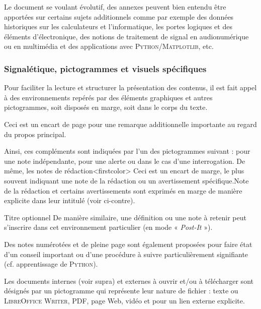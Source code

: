 Le document se voulant évolutif, des annexes peuvent bien entendu être apportées sur certains sujets additionnels comme par exemple des données historiques sur les calculateurs et l'informatique, les portes logiques et des éléments d'électronique, des notions de traitement de signal en audionumérique ou en multimédia et des applications avec \textsc{Python}/\textsc{Matplotlib}, etc.


\subsubsection*{Signalétique, pictogrammes et visuels spécifiques}

Pour faciliter la lecture et structurer la présentation des contenus, il est fait appel à des environnements repérés par des éléments graphiques et autres pictogrammes, soit disposés en marge, soit dans le corps du texte.

\pagebreak
\begin{remark}
Ceci est un encart de page pour une remarque additionnelle importante au regard du propos principal.
\end{remark}

Ainsi, ces compléments sont indiquées par l'un des pictogrammes suivant : \textcolor{firstcolor}{\faEye} pour une note indépendante, \textcolor{firstcolor}{\faExclamationTriangle} pour une alerte ou \textcolor{firstcolor}{\faQuestion} dans le cas d'une interrogation.
De même, les notes de rédaction\caution[t]<firstcolor>{%
Ceci est un encart de marge, le plus souvent indiquant une note de la rédaction ou un avertissement spécifique.}{Note de la rédaction}
 et certains avertissements sont exprimés en marge de manière explicite dans leur intitulé (voir ci-contre).

\begin{marker}{Titre optionnel}
De manière similaire, une définition ou une note à retenir peut s’inscrire dans cet environnement particulier (en mode « \textit{Post-It} »).
\end{marker}


\begin{linewidthnote}
Des notes numérotées et de pleine page sont également proposées pour faire état d'un conseil important ou d'une procédure à suivre particulièrement signifiante (cf. apprentissage de \textsc{Python}).
\end{linewidthnote}
\setcounter{linewidthnote}{0}

Les documents internes (voir supra) et externes à ouvrir et/ou à télécharger sont désignés par un pictogramme qui représente leur nature de fichier : \textcolor{secondcolor}{\faFileTextO} texte ou \textsc{LibreOffice} \textsc{Writer}, \textcolor{secondcolor}{\faFilePdfO} PDF, \textcolor{secondcolor}{\faFirefox} page Web, \textcolor{secondcolor}{\faVideoCamera} vidéo et \textcolor{secondcolor}{\faExternalLink} pour un lien externe explicite.

